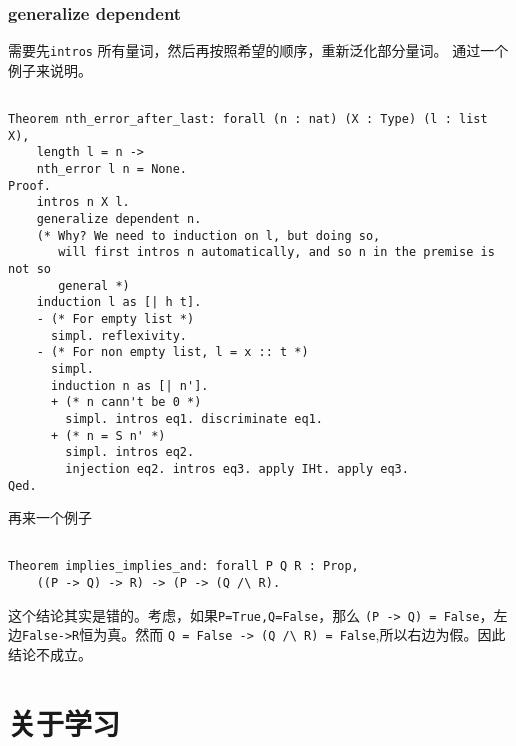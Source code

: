 \documentclass{book}
\begin{document}
\subsection{generalize dependent}
需要先\verb|intros| 所有量词，然后再按照希望的顺序，重新泛化部分量词。
通过一个例子来说明。
\begin{lstlisting}[language=Coq]

Theorem nth_error_after_last: forall (n : nat) (X : Type) (l : list X),
    length l = n ->
    nth_error l n = None.
Proof.
    intros n X l.
    generalize dependent n.
    (* Why? We need to induction on l, but doing so,
       will first intros n automatically, and so n in the premise is not so
       general *)
    induction l as [| h t].
    - (* For empty list *)
      simpl. reflexivity.
    - (* For non empty list, l = x :: t *)
      simpl.
      induction n as [| n'].
      + (* n cann't be 0 *)
        simpl. intros eq1. discriminate eq1.
      + (* n = S n' *)
        simpl. intros eq2.
        injection eq2. intros eq3. apply IHt. apply eq3.
Qed.
\end{lstlisting}

再来一个例子
\begin{lstlisting}[language=Coq]%

Theorem implies_implies_and: forall P Q R : Prop,
    ((P -> Q) -> R) -> (P -> (Q /\ R).
\end{lstlisting}

这个结论其实是错的。考虑，如果\verb|P=True,Q=False|，那么
\lstinline[language=Coq]|(P -> Q) = False|，左边\lstinline[language=Coq]|False->R|恒为真。然而
\lstinline[language=Coq]|Q = False -> (Q /\ R) = False|,所以右边为假。因此结论不成立。

\chapter{关于学习}
\end{document}
